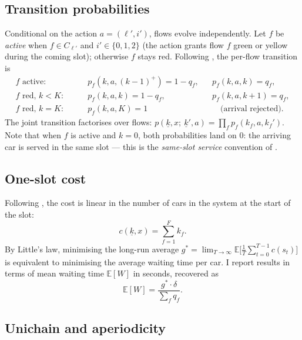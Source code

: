 \documentclass[11pt,a4paper]{article}
\newcommand{\E}{\mathbb{E}}
\begin{document}
\subsection{Transition probabilities}

Conditional on the action $a = (\ell', i')$, flows evolve
independently. Let $f$ be \emph{active} when $f \in C_{\ell'}$ and
$i' \in \{0, 1, 2\}$ (the action grants flow $f$ green or yellow
during the coming slot); otherwise $f$ stays red. Following
\cite[\S 3.3]{haijema2008}, the per-flow transition is
\begin{equation}
\begin{aligned}
\text{$f$ active:} \qquad
    & p_f(k, a, (k - 1)^+) = 1 - q_f, &&
      p_f(k, a, k) = q_f, \\
\text{$f$ red, } k < K: \qquad
    & p_f(k, a, k) = 1 - q_f, &&
      p_f(k, a, k + 1) = q_f, \\
\text{$f$ red, } k = K: \qquad
    & p_f(k, a, K) = 1 &&
      \quad \text{(arrival rejected)}.
\end{aligned}
\end{equation}
The joint transition factorises over flows:
$
    p(\underline{k}, x;\ \underline{k}', a) = \prod_f p_f(k_f, a, k_f').
$
Note that when $f$ is active and $k = 0$, both probabilities land on
$0$: the arriving car is served in the same slot --- this is the
\emph{same-slot service} convention of \cite[\S 2.6]{haijema2008}.

\subsection{One-slot cost}

Following \cite[\S 3.4]{haijema2008}, the cost is linear in the number
of cars in the system at the start of the slot:
\begin{equation}
    c(\underline{k}, x) = \sum_{f = 1}^{F} k_f.
\end{equation}
By Little's law, minimising the long-run average $g^* = \lim_{T \to \infty}
\E\big[\frac{1}{T} \sum_{t = 0}^{T - 1} c(s_t)\big]$ is equivalent to
minimising the average waiting time per car. I report results in
terms of mean waiting time $\E[W]$ in seconds, recovered as
\begin{equation}
    \E[W] = \frac{g^* \cdot \delta}{\sum_f q_f}.
\end{equation}

\subsection{Unichain and aperiodicity}
\label{ssec:unichain}
\end{document}
